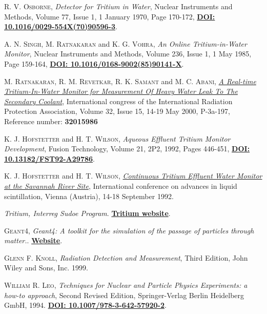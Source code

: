 \begin{thebibliography}{100}
 \textsc{R. V. Osborne},
\textit{Detector for Tritium in Water}, Nuclear Instruments and Methods, Volume 77, Issue 1, 1 January 1970, Page 170-172, \href{https://doi.org/10.1016/0029-554X(70)90596-3}{\textbf{DOI: 10.1016/0029-554X(70)90596-3}}.

 \textsc{A. N. Singh}, \textsc{M. Ratnakaran} and \textsc{K. G. Vohra},
\textit{An Online Tritium-in-Water Monitor}, Nuclear Instruments and Methods, Volume 236, Issue 1, 1 May 1985, Page 159-164, \href{https://doi.org/10.1016/0168-9002(85)90141-X}{\textbf{DOI: 10.1016/0168-9002(85)90141-X}}.

 \textsc{M. Ratnakaran}, \textsc{R. M. Revetkar}, \textsc{R. K. Samant} and \textsc{M. C. Abani},
\href{https://inis.iaea.org/search/search.aspx?orig_q=RN:32015986}{\textit{A Real-time Tritium-In-Water Monitor for Measurement Of Heavy Water Leak To The Secondary Coolant}}, International congress of the International Radiation Protection Association, Volume 32, Issue 15, 14-19 May 2000, P-3a-197, Reference number: \textbf{32015986}

 \textsc{K. J. Hofstetter} and \textsc{H. T. Wilson},
\textit{Aqueous Effluent Tritium Monitor Development}, Fusion Technology, Volume 21, 2P2, 1992, Pages 446-451, \href{https://doi.org/10.13182/FST92-A29786}{\textbf{DOI: 10.13182/FST92-A29786}}.

 \textsc{K. J. Hofstetter} and \textsc{H. T. Wilson},
\href{https://www.osti.gov/biblio/6865647-continuous-tritium-effluent-water-monitor-savannah-river-site}{\textit{Continuous Tritium Effluent Water Monitor at the Savannah River Site}}, International conference on advances in liquid scintillation, Vienna (Austria), 14-18 September 1992.

 \textit{Tritium, Interreg Sudoe Program}. 
\href{https://tritium-sudoe.eu/es-es/homepage}{\textbf{Tritium website}}.

 \textsc{Geant4},
\textit{Geant4: A toolkit for the simulation of the passage of particles through matter.}. \href{https://geant4.web.cern.ch/node/1}{\textbf{Website}}.

 \textsc{Glenn F. Knoll}, 
\textit{Radiation Detection and Measurement}, Third Edition, John Wiley and Sons, Inc. 1999.

 \textsc{William R. Leo},
\textit{Techniques for Nuclear and Particle Physics Experiments: a how-to approach}, Second Revised Edition, Springer-Verlag Berlin Heidelberg GmbH, 1994. \href{https://doi.org/10.1007/978-3-642-57920-2}{\textbf{DOI: 10.1007/978-3-642-57920-2}}. 


\end{thebibliography}
